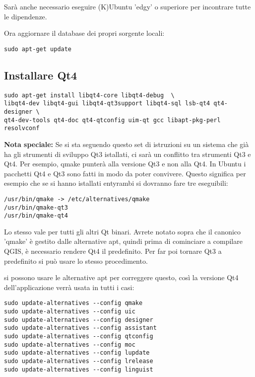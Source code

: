 Sarà anche necessario eseguire (K)Ubuntu 'edgy' o superiore per incontrare tutte le dipendenze.

Ora aggiornare il  database dei propri sorgente locali:

\begin{verbatim}
sudo apt-get update 
\end{verbatim}

\subsection{Installare Qt4}
\begin{verbatim}
sudo apt-get install libqt4-core libqt4-debug  \
libqt4-dev libqt4-gui libqt4-qt3support libqt4-sql lsb-qt4 qt4-designer \
qt4-dev-tools qt4-doc qt4-qtconfig uim-qt gcc libapt-pkg-perl resolvconf
\end{verbatim}

\textbf{Nota speciale:} Se si sta seguendo questo set di istruzioni su un sistema che già ha gli strumenti di sviluppo Qt3 istallati, ci sarà un conflitto tra strumenti Qt3 e Qt4. Per esempio, qmake punterà alla versione Qt3 e non alla Qt4. In Ubuntu i pacchetti Qt4 e Qt3 sono fatti in modo da poter convivere. Questo significa per esempio che se si hanno istallati entyrambi si dovranno fare tre eseguibili:

\begin{verbatim}
/usr/bin/qmake -> /etc/alternatives/qmake 
/usr/bin/qmake-qt3
/usr/bin/qmake-qt4 
\end{verbatim}

Lo stesso vale per tutti gli altri Qt binari. Avrete notato sopra che il canonico 'qmake' è gestito dalle alternative apt, quindi prima di cominciare a compilare QGIS, è necessario rendere Qt4 il predefinito. Per far poi tornare Qt3 a predefinito si può usare lo stesso procedimento.

si possono usare le alternative apt per correggere questo, così la versione Qt4 dell'applicazione verrà usata in tutti i casi:

\begin{verbatim}
sudo update-alternatives --config qmake
sudo update-alternatives --config uic 
sudo update-alternatives --config designer 
sudo update-alternatives --config assistant 
sudo update-alternatives --config qtconfig 
sudo update-alternatives --config moc 
sudo update-alternatives --config lupdate 
sudo update-alternatives --config lrelease 
sudo update-alternatives --config linguist 
\end{verbatim}

